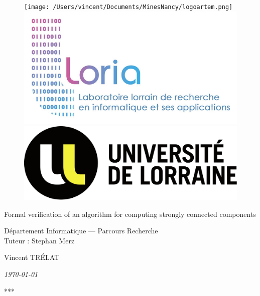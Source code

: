 \documentclass[a4 paper, 12pt]{article}
\theoremstyle{definition}
\begin{document}
\begin{titlepage}
    \begin{figure}[!h]
        \centering
        \texttt{[image: /Users/vincent/Documents/MinesNancy/logoartem.png]}
        \hspace{1cm}
        \includegraphics[height = .1\textwidth]{img/logoloria.jpg}
        \hspace{1cm}
        \includegraphics[height = .1\textwidth]{img/logoUL.png}
    \end{figure}
    \vspace{3cm}

    \begin{center}
        \huge{Formal verification of an algorithm for computing strongly connected components}
    \end{center}
    \vspace{1cm}
    \begin{center}
        \large{Département Informatique --- Parcours Recherche \\ Tuteur : Stephan Merz}
    \end{center}
    \vspace{1 cm}
    \begin{center}
        Vincent TRÉLAT
    \end{center}
    \vspace{2 cm}
    \begin{center}
        \textit{\today}
    \end{center}
    \vspace{2 cm}
    \begin{center}
        ***
    \end{center}
    
\end{titlepage}
\restoregeometry
\pagebreak

\pagebreak

\tableofcontents
\pagebreak
\end{document}
